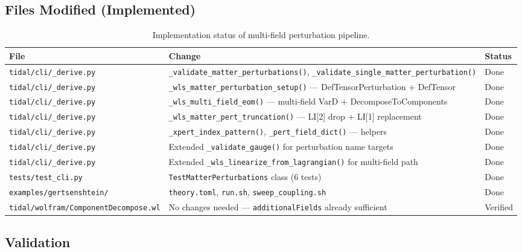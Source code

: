\subsection{Files Modified (Implemented)}
\label{sec:mfp-files}

\begin{table}[htbp]
\centering
\caption{Implementation status of multi-field perturbation pipeline.}
\label{tab:mfp-files}
\begin{tabular}{@{}lll@{}}
\toprule
File & Change & Status \\
\midrule
\texttt{tidal/cli/\_derive.py} & \texttt{\_validate\_matter\_perturbations()}, \texttt{\_validate\_single\_matter\_perturbation()} & Done \\
\texttt{tidal/cli/\_derive.py} & \texttt{\_wls\_matter\_perturbation\_setup()} --- DefTensorPerturbation + DefTensor & Done \\
\texttt{tidal/cli/\_derive.py} & \texttt{\_wls\_multi\_field\_eom()} --- multi-field VarD + DecomposeToComponents & Done \\
\texttt{tidal/cli/\_derive.py} & \texttt{\_wls\_matter\_pert\_truncation()} --- LI[2] drop + LI[1] replacement & Done \\
\texttt{tidal/cli/\_derive.py} & \texttt{\_xpert\_index\_pattern()}, \texttt{\_pert\_field\_dict()} --- helpers & Done \\
\texttt{tidal/cli/\_derive.py} & Extended \texttt{\_validate\_gauge()} for perturbation name targets & Done \\
\texttt{tidal/cli/\_derive.py} & Extended \texttt{\_wls\_linearize\_from\_lagrangian()} for multi-field path & Done \\
\texttt{tests/test\_cli.py} & \texttt{TestMatterPerturbations} class (6 tests) & Done \\
\texttt{examples/gertsenshtein/} & \texttt{theory.toml}, \texttt{run.sh}, \texttt{sweep\_coupling.sh} & Done \\
\texttt{tidal/wolfram/ComponentDecompose.wl} & No changes needed --- \texttt{additionalFields} already sufficient & Verified \\
\bottomrule
\end{tabular}
\end{table}

\subsection{Validation}
\label{sec:mfp-validation}

